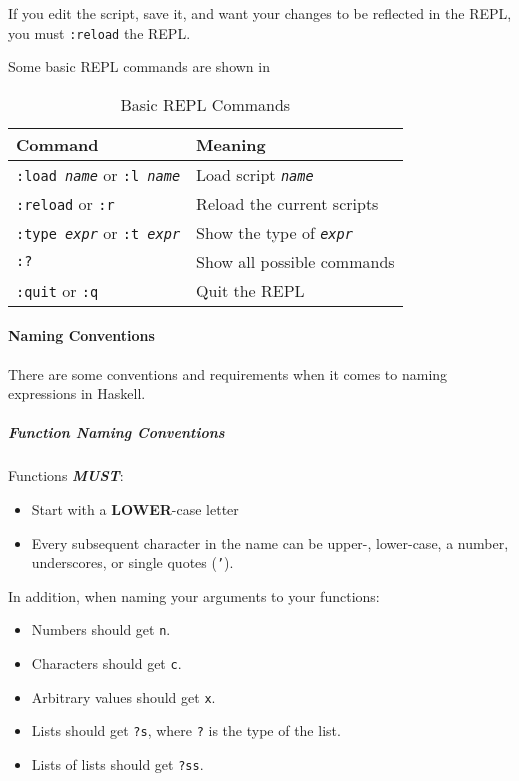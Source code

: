 If you edit the script, save it, and want your changes to be reflected in the REPL, you must \texttt{:reload} the REPL.\@

Some basic REPL commands are shown in 

\begin{table}[h!tbp]
  \centering
  \begin{tabular}{ll}
    \toprule
    Command & Meaning \\
    \midrule
    \texttt{:load \emph{name}} or \texttt{:l \emph{name}} & Load script \texttt{\emph{name}} \\
    \texttt{:reload} or \texttt{:r} & Reload the current scripts \\
    \texttt{:type \emph{expr}} or \texttt{:t \emph{expr}} & Show the type of \texttt{\emph{expr}} \\
    \texttt{:?} & Show all possible commands\\
    \texttt{:quit} or \texttt{:q} & Quit the REPL \\
    \bottomrule
  \end{tabular}
  \caption{Basic REPL Commands}
  \label{tab:Basic_REPL_Commands}
\end{table}

\paragraph{Naming Conventions}\label{par:Naming_Conventions}
There are some conventions and requirements when it comes to naming expressions in Haskell.

\subparagraph{Function Naming Conventions}\label{subpar:Function_Naming_Conventions}
Functions \textbf{\emph{MUST}}:
\begin{itemize}[noitemsep]
\item Start with a \textbf{LOWER}-case letter
\item Every subsequent character in the name can be upper-, lower-case, a number, underscores, or single quotes (\texttt{'}).
\end{itemize}

In addition, when naming your arguments to your functions:
\begin{itemize}[noitemsep]
\item Numbers should get \texttt{n}.
\item Characters should get \texttt{c}.
\item Arbitrary values should get \texttt{x}.
\item Lists should get \texttt{?s}, where \texttt{?} is the type of the list.
\item Lists of lists should get \texttt{?ss}.
\end{itemize}



